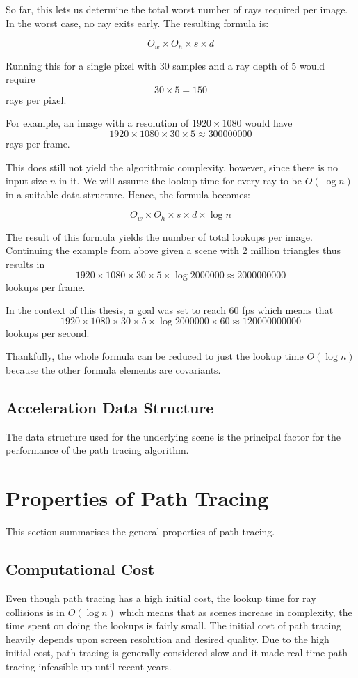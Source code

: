 \documentclass[
  twoside,
  11pt, a4paper,
  footinclude=true,
  headinclude=true,
  cleardoublepage=empty
]{scrreprt}
\begin{document}
So far, this lets us determine the total worst number of rays required per image. In the worst
case, no ray exits early. The resulting formula is:

\[ O_w \times O_h \times s \times d \]

Running this for a single pixel with 30 samples and a ray depth of 5 would require
\[30 \times 5 = \num{150}\]
rays per pixel.

For example, an image with a resolution of \(1920 \times 1080\)
would have \[1920 \times 1080 \times 30 \times 5 \approx \num{300000000}\] rays per frame.

This does still not yield the algorithmic complexity, however, since there is no input size \(n\)
in it. We will assume the lookup time for every ray to be \(O(\log n)\) in a suitable data
structure. Hence, the formula becomes:

\[ O_w \times O_h \times s \times d \times \log n \]

The result of this formula yields the number of total lookups per image.
Continuing the example from above given a scene with 2 million triangles thus results in
\[1920 \times 1080 \times 30 \times 5 \times \log \num{2000000} \approx \num{2000000000}\]
lookups per frame.

In the context of this thesis, a goal was set to reach 60 \ac{fps} which means that
\[1920 \times 1080 \times 30 \times 5 \times \log \num{2000000} \times 60 \approx \num{120000000000}\]
lookups per second.

Thankfully, the whole formula can be reduced to just the lookup time \(O(\log n)\) because the other
formula elements are covariants.

\subsection{Acceleration Data Structure}
The data structure used for the underlying scene is the principal factor for the performance of the
path tracing algorithm.

\section{Properties of Path Tracing}
This section summarises the general properties of path tracing.

\subsection{Computational Cost}
Even though path tracing has a high initial cost, the lookup time for ray collisions is in
\(O(\log n)\) which means that as scenes increase in complexity, the time spent on doing the
lookups is fairly small. The initial cost of path tracing heavily depends upon screen resolution
and desired quality. Due to the high initial cost, path tracing is generally considered slow and
it made real time path tracing infeasible up until recent years.
\end{document}
